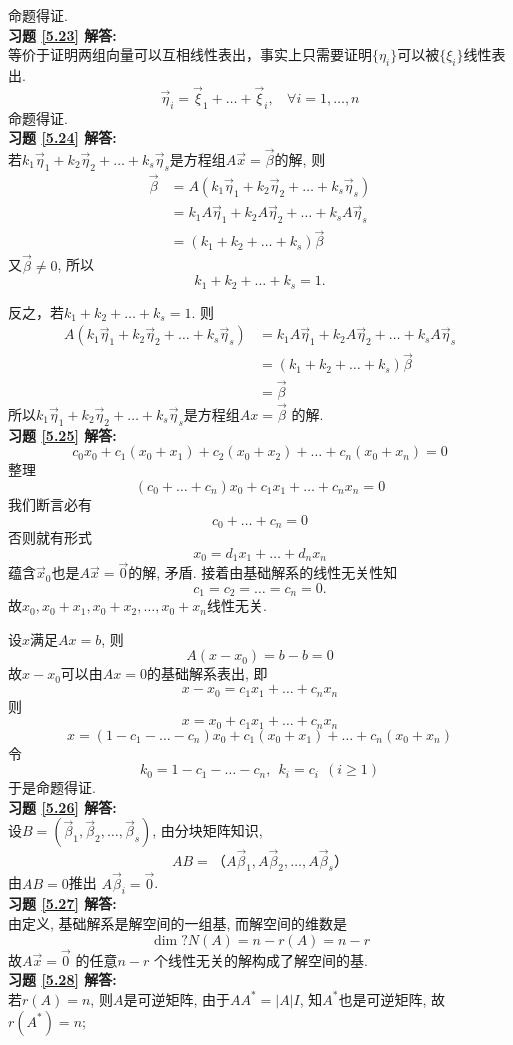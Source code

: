 命题得证.\\
\textbf{习题 \ref{5.23} 解答:}\\
等价于证明两组向量可以互相线性表出，事实上只需要证明$\{\eta_i \}$可以被$\{\xi_i \}$线性表出.
$$\vec{\eta}_i=\vec{\xi}_1+\dots+\vec{\xi}_i,\ \ \ \   \forall i=1,\dots,n$$
命题得证.\\
\textbf{习题 \ref{5.24} 解答:}\\
若$k_1 \vec{\eta}_1+k_2 \vec{\eta}_2+\dots+k_s  \vec{\eta}_s$是方程组$A\vec{x}=\vec{\beta}$的解, 则
\begin{displaymath}\begin{aligned}
\vec{\beta}&=A(k_1 \vec{\eta}_1+k_2 \vec{\eta}_2+\dots+k_s \vec{\eta}_s )\\&=k_1 A\vec{\eta}_1+k_2 A\vec{\eta}_2+\dots+k_s A\vec{\eta}_s\\&=(k_1+k_2+\dots+k_s )\vec{\beta}
\end{aligned}
\end{displaymath}
又$\vec{\beta}\not=0$, 所以$$k_1+k_2+\dots+k_s=1.$$

反之，若$k_1+k_2+\dots+k_s=1.$ 则
\begin{displaymath}\begin{aligned}
A(k_1 \vec{\eta}_1+k_2 \vec{\eta}_2+\dots+k_s \vec{\eta}_s )&=k_1 A\vec{\eta}_1+k_2 A\vec{\eta}_2+\dots+k_s A\vec{\eta}_s\\&=(k_1+k_2+\dots+k_s )\vec{\beta}\\&=\vec{\beta}
\end{aligned}
\end{displaymath}
所以$k_1 \vec{\eta}_1+k_2 \vec{\eta}_2+\dots+k_s \vec{\eta}_s$是方程组$Ax=\vec{\beta}$ 的解.\\
\textbf{习题 \ref{5.25} 解答:}\\
$$c_0 x_0+c_1 (x_0+x_1 )+c_2 (x_0+x_2 )+\dots+c_n (x_0+x_n )=0$$
整理
$$(c_0+\dots+c_n) x_0+c_1 x_1+\dots+c_n x_n=0$$
我们断言必有$$c_0+\dots+c_n=0$$
否则就有形式$$x_0=d_1 x_1+\dots+d_n x_n$$
蕴含$\vec{x}_0$也是$A\vec{x}=\vec{0}$的解, 矛盾. 接着由基础解系的线性无关性知$$c_1=c_2=\dots=c_n=0.$$
故$x_0,x_0+x_1,x_0+x_2,\dots,x_0+x_n$线性无关.

设$x$满足$Ax=b$, 则$$A(x-x_0)=b-b=0$$ 故$x-x_0$可以由$Ax=0$的基础解系表出, 即$$x-x_0=c_1 x_1+\dots+c_n x_n$$
则$$x=x_0+c_1 x_1+\dots+c_n x_n$$
$$x=(1-c_1-\dots-c_n ) x_0+c_1 (x_0+x_1 )+\dots+c_n (x_0+x_n )$$
令$$k_0=1-c_1-\dots-c_n,\ \ k_i=c_i\ \  (i≥1)$$
于是命题得证.\\
\textbf{习题 \ref{5.26} 解答:}\\
设$B=(\vec{\beta}_1,\vec{\beta}_2,\dots,\vec{\beta}_s)$, 由分块矩阵知识, $$AB=（A\vec{\beta}_1,A\vec{\beta}_2,\dots,A\vec{\beta}_s ）$$
由$AB=0$推出 $A\vec{\beta}_i=\vec{0}$.\\
\textbf{习题 \ref{5.27} 解答:}\\
由定义, 基础解系是解空间的一组基, 而解空间的维数是
\begin{displaymath}\dim ?N(A)=n-r(A)=n-r\end{displaymath}
故$A\vec{x}=\vec{0}$ 的任意$n-r$ 个线性无关的解构成了解空间的基.\\
\textbf{习题 \ref{5.28} 解答:}\\
 若$r(A)=n$, 则$A$是可逆矩阵, 由于$AA^{*}=|A|I$, 知$A^{*}$也是可逆矩阵, 故$r(A^{*})=n$;


